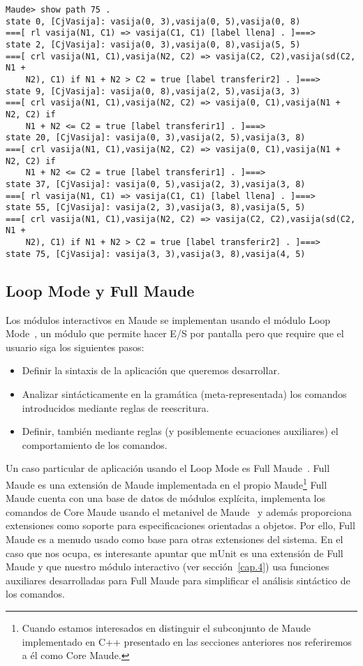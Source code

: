 {\codesize
\begin{verbatim}
Maude> show path 75 .
state 0, [CjVasija]: vasija(0, 3),vasija(0, 5),vasija(0, 8)
===[ rl vasija(N1, C1) => vasija(C1, C1) [label llena] . ]===>
state 2, [CjVasija]: vasija(0, 3),vasija(0, 8),vasija(5, 5)
===[ crl vasija(N1, C1),vasija(N2, C2) => vasija(C2, C2),vasija(sd(C2, N1 +
    N2), C1) if N1 + N2 > C2 = true [label transferir2] . ]===>
state 9, [CjVasija]: vasija(0, 8),vasija(2, 5),vasija(3, 3)
===[ crl vasija(N1, C1),vasija(N2, C2) => vasija(0, C1),vasija(N1 + N2, C2) if
    N1 + N2 <= C2 = true [label transferir1] . ]===>
state 20, [CjVasija]: vasija(0, 3),vasija(2, 5),vasija(3, 8)
===[ crl vasija(N1, C1),vasija(N2, C2) => vasija(0, C1),vasija(N1 + N2, C2) if
    N1 + N2 <= C2 = true [label transferir1] . ]===>
state 37, [CjVasija]: vasija(0, 5),vasija(2, 3),vasija(3, 8)
===[ rl vasija(N1, C1) => vasija(C1, C1) [label llena] . ]===>
state 55, [CjVasija]: vasija(2, 3),vasija(3, 8),vasija(5, 5)
===[ crl vasija(N1, C1),vasija(N2, C2) => vasija(C2, C2),vasija(sd(C2, N1 +
    N2), C1) if N1 + N2 > C2 = true [label transferir2] . ]===>
state 75, [CjVasija]: vasija(3, 3),vasija(3, 8),vasija(4, 5)
\end{verbatim}
}

\subsection{Loop Mode y Full Maude}

Los módulos interactivos en Maude se implementan usando el módulo
Loop Mode~\cite[capítulo 17]{maudeBook}, un módulo que permite
hacer E/S por pantalla pero que require que el usuario siga los siguientes pasos:
\begin{itemize}
\item
Definir la sintaxis de la aplicación que queremos desarrollar.

\item
Analizar sintácticamente en la gramática (meta-representada) los comandos introducidos
mediante reglas de reescritura.

\item
Definir, también mediante reglas (y posiblemente ecuaciones auxiliares) el comportamiento
de los comandos.
\end{itemize}

Un caso particular de aplicación usando el Loop Mode es Full Maude~\cite[parte 2]{maudeBook}.
Full Maude es una extensión de Maude implementada en el propio Maude\footnote{Cuando estamos
interesados en distinguir el subconjunto de Maude implementado en C++ presentado en las
secciones anteriores nos referiremos a él como Core Maude.} Full Maude cuenta con una base de
datos de módulos explícita, implementa los comandos de Core Maude usando el metanivel de
Maude~\cite[capítulo 14]{maudeBook} y además proporciona extensiones como soporte para
especificaciones orientadas a objetos. Por ello, Full Maude es a menudo usado como base para
otras extensiones del sistema. En el caso que nos ocupa, es interesante apuntar que mUnit
es una extensión de Full Maude y que nuestro módulo interactivo (ver sección~\ref{cap.4})
usa funciones auxiliares desarrolladas para Full Maude para simplificar el análisis sintáctico
de los comandos.

